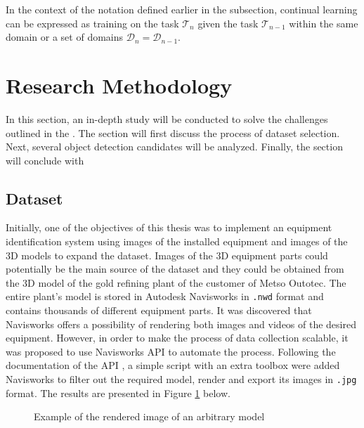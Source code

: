 \documentclass[english, 12pt, a4paper, elec, utf8, a-1b, online]{aaltothesis}
\begin{document}
In the context of the notation defined earlier in the   subsection, continual learning can be expressed as training on the task $\mathcal{T}_n$ given the task $\mathcal{T}_{n-1}$ within the same domain or a set of domains $\mathcal{D}_{n} = \mathcal{D}_{n-1}$.   


\clearpage 

\section{Research Methodology}
\label{Methodology}

In this section, an in-depth study will be conducted to solve the challenges outlined in the . The section will first discuss the process of dataset selection. Next, several object detection candidates will be analyzed. Finally, the section will conclude with 

\subsection{Dataset}

Initially, one of the objectives of this thesis was to implement an equipment identification system using images of the installed equipment and images of the 3D models to expand the dataset. Images of the 3D equipment parts could potentially be the main source of the dataset and they could be obtained from the 3D model of the gold refining plant of the customer of Metso Outotec. The entire plant's model is stored in Autodesk Navisworks in \texttt{.nwd} format and contains thousands of different equipment parts. It was discovered that Navisworks offers a possibility of rendering both images and videos of the desired equipment. However, in order to make the process of data collection scalable, it was proposed to use Navisworks API to automate the process. Following the documentation of the API \cite{navisworks}, a simple script with an extra toolbox were added Navisworks to filter out the required model, render and export its images in \texttt{.jpg} format. The results are presented in Figure \ref{navisworks} below.

\begin{figure}[htb]
    \centering
    \qquad
    \caption{Example of the rendered image of an arbitrary model}
    \label{navisworks}%
\end{figure}
\FloatBarrier
\end{document}
